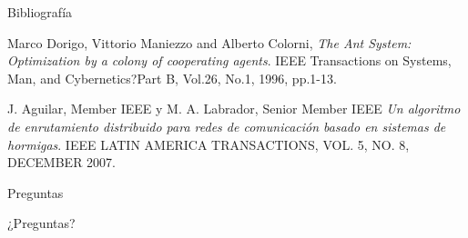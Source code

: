 \documentclass{beamer}
\begin{document}
\begin{frame}{Bibliografía}
\begin{thebibliography}{99}
Marco Dorigo, Vittorio Maniezzo and Alberto Colorni,
\emph{The Ant System: Optimization by a colony of cooperating agents}. 
IEEE Transactions on Systems, Man, and Cybernetics?Part B, Vol.26, No.1, 1996, pp.1-13.

J. Aguilar, Member IEEE y M. A. Labrador, Senior Member IEEE
\emph{Un algoritmo de enrutamiento distribuido para redes de comunicación basado en sistemas de hormigas}. 
IEEE LATIN AMERICA TRANSACTIONS, VOL. 5, NO. 8,
DECEMBER 2007.
\end{thebibliography}
\end{frame}
\begin{frame}{Preguntas}

\begin{block}{}
\begin{center}
{\Huge ¿Preguntas?}
\end{center}
\end{block}

\end{frame}
\end{document}
